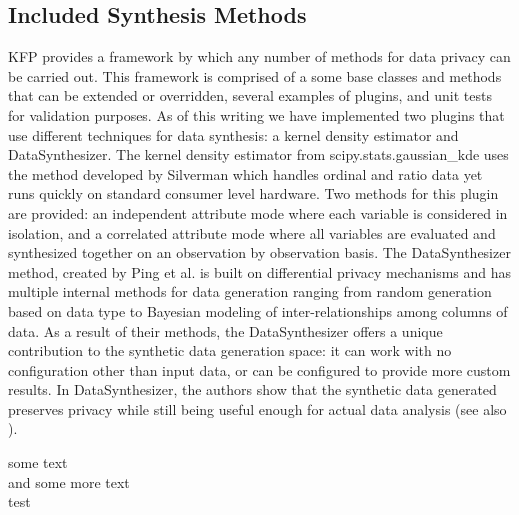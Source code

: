 \documentclass{amia}
\begin{document}
\subsection{Included Synthesis Methods}

KFP provides a framework by which any number of methods for data privacy can be carried out. This framework is comprised of a some base classes and methods that can be extended or overridden, several examples of plugins, and unit tests for validation purposes. As of this writing we have implemented two plugins that use different techniques for data synthesis: a kernel density estimator and DataSynthesizer. The kernel density estimator from scipy.stats.gaussian\_kde uses the method developed by Silverman \cite{silverman_density_1986} which handles ordinal and ratio data yet runs quickly on standard consumer level hardware. Two methods for this plugin are provided: an independent attribute mode where each variable is considered in isolation, and a correlated attribute mode where all variables are evaluated and synthesized together on an observation by observation basis. The DataSynthesizer method, created by Ping et al. \cite{ping17datasynthesizer} is built on differential privacy mechanisms and has multiple internal methods for data generation ranging from random generation based on data type to Bayesian modeling of inter-relationships among columns of data. As a result of their methods, the DataSynthesizer offers a unique contribution to the synthetic data generation space: it can work with no configuration other than input data, or can be configured to provide more custom results. In DataSynthesizer, the authors show that the synthetic data generated preserves privacy while still being useful enough for actual data analysis (see also \cite{howe_synthetic_2017}).

some text \\ and some more text \\ test
\end{document}
